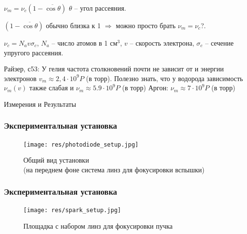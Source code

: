 \documentclass{beamer}
\begin{document}
	\begin{frame}
		$\nu_m = \nu_c (1 - \overline{\cos{\theta}})$
		$\theta$ -- угол рассеяния.
		
		$(1 - \overline{\cos{\theta}})$ обычно близка к 1 $\Rightarrow$ можно просто брать $\nu_m = \nu_c$?.
		
		$\nu_c = N_a v \sigma_c$, $N_a$ -- число атомов в 1 см$^3$, $v$ -- скорость электрона, $\sigma_c$ -- сечение упругого рассеяния.
		
		Райзер, с53: У гелия частота столкновений почти не зависит от и энергии электронов $v_m \approx 2,4\cdot 10^9 P$ (в торр). Полезно знать, что у водорода зависимость $\nu_m (v)$ также слабая и $\nu_m \approx 5.9 \cdot 10^9 P$ (в торр)
		Аргон: $\nu_m \approx 7 \cdot 10^9 P$ (в торр)
	\end{frame}
	
	\begin{frame}[plain,c]
		
		\begin{center}
			\huge {} Измерения и Результаты
		\end{center}
		
	\end{frame}
	
	
	\begin{frame}
		\frametitle{Экспериментальная установка}
		\begin{figure}
			\centering
			\texttt{[image: res/photodiode\_setup.jpg]}
			\caption*{Общий вид установки\\ \footnotesize (на переднем фоне система линз для фокусировки вспышки) }
		\end{figure}
	\end{frame}

	\begin{frame}
		\frametitle{Экспериментальная установка}
		\begin{figure}
			\centering
			\texttt{[image: res/spark\_setup.jpg]}
			\caption*{Площадка с набором линз для фокусировки пучка}
		\end{figure}
		
	\end{frame}
	
\end{document}

